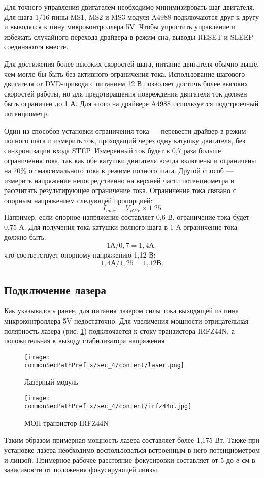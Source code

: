 Для точного управления двигателем необходимо минимизировать шаг двигателя. 
Для шага 1/16 пины MS1, MS2 и MS3 модуля A4988 подключаются друг к другу и выводятся к пину микроконтроллера 5V. 
Чтобы упростить управление и избежать случайного перехода драйвера в режим сна, выводы RESET и SLEEP соединяются вместе.

Для достижения более высоких скоростей шага, питание двигателя обычно выше, чем могло бы быть без активного ограничения тока. 
Использование шагового двигателя от DVD-привода с питанием 12 В позволяет достичь более высоких скоростей работы, 
но для предотвращения повреждения двигателя ток должен быть ограничен до 1 А. 
Для этого на драйвере A4988 используется подстроечный потенциометр.

Один из способов установки ограничения тока — перевести драйвер в режим полного шага и измерить ток, 
проходящий через одну катушку двигателя, без синхронизации входа STEP. 
Измеренный ток будет в 0,7 раза больше ограничения тока, так как обе катушки двигателя всегда включены и ограничены на 
70\% от максимального тока в режиме полного шага. Другой способ — измерить напряжение непосредственно на верхней части 
потенциометра и рассчитать результирующее ограничение тока. Ограничение тока связано с опорным напряжением следующей пропорцией: 
\[I_{max} = V_{REF} \times 1.25\]
Например, если опорное напряжение составляет 0,6 В, ограничение тока будет 0,75 А. 
Для получения тока катушки полного шага в 1 А ограничение тока должно быть:
\[1 \text{А}/ 0,7 = 1,4 \text{А};\]
что соответствует опорному напряжению 1,12 В:
\[1,4 \text{А}/ 1,25 = 1,12 \text{В}.\]

\subsection{Подключение лазера}

Как указывалось ранее, для питания лазером силы тока выходящей из пина микроконтроллера 5V недостаточно. 
Для увеличения мощности отрицательная полярность лазера (рис. \ref{fig:laser}) подключается к стоку транзистора IRFZ44N\cite{IRFZ44N_sheet}, а положительная к 
выходу стабилизатора напряжения. 

\begin{figure}[ht]
    \centering
    \texttt{[image: \\commonSecPathPrefix/sec\_4/content/laser.png]}
    \caption{Лазерный модуль}
    \label{fig:laser}
\end{figure}

\begin{figure}[ht]
    \centering
    \texttt{[image: \\commonSecPathPrefix/sec\_4/content/irfz44n.jpg]}
    \caption{МОП-транзистор IRFZ44N}
    \label{fig:irfz44n}
\end{figure}

Таким образом примерная мощность лазера составляет более 1,175 Вт. Также при установке
лазера необходимо воспользоваться встроенным в него потенциометром и линзой\cite{schemt_2}.
Примерное рабочее расстояние фокусировки составляет от 5 до 8 см в зависимости от положения фокусирующей линзы.


